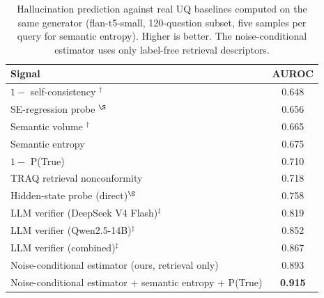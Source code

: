 \documentclass[sn-basic]{sn-jnl}
\theoremstyle{thmstyleone}
\theoremstyle{thmstyletwo}
\begin{document}
\begin{table}[tbp]
\centering\small
\caption{Hallucination prediction against real UQ baselines computed on the
same generator (flan-t5-small, 120-question subset, five samples per query
for semantic entropy). Higher is better. The noise-conditional estimator
uses only label-free retrieval descriptors.}
\label{tab:baselines}
\begin{tabular}{lc}
\toprule
Signal & AUROC \\
\midrule
$1 - $ self-consistency \citep{wang2023selfconsistency}$^\dagger$ & 0.648 \\
SE-regression probe \citep{kossen2024sep}$^\S$                & 0.656 \\
Semantic volume \citep{li2026semanticvolume}$^\dagger$        & 0.665 \\
Semantic entropy \citep{kuhn2023semantic,farquhar2024nature} & 0.675 \\
$1 - $ P(True) \citep{kadavath2022language}                      & 0.710 \\
TRAQ retrieval nonconformity \citep{li2024traq}               & 0.718 \\
Hidden-state probe (direct)$^\S$                              & 0.758 \\
LLM verifier (DeepSeek V4 Flash)$^\ddagger$                   & 0.819 \\
LLM verifier (Qwen2.5-14B)$^\ddagger$                         & 0.852 \\
LLM verifier (combined)$^\ddagger$                            & 0.867 \\
Noise-conditional estimator (ours, retrieval only)           & 0.893 \\
Noise-conditional estimator $+$ semantic entropy $+$ P(True) & \textbf{0.915} \\
\bottomrule
\end{tabular}


\end{table}
\end{document}
